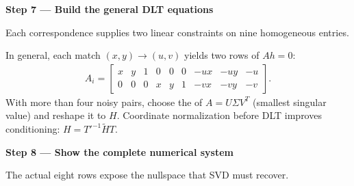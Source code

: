 \documentclass[letterpaper,11pt,english,openany,oneside]{jupyterBook}
\begin{document}
\par\medskip{}
{\color{QuizStepRed}\bfseries Step 7 — Build the general DLT equations}\par\smallskip

\sphinxAtStartPar
{} Each correspondence supplies two linear constraints on nine homogeneous entries.

\sphinxAtStartPar
In general, each match {\color{QuizMathBlue} \((x,y)\to(u,v)\)} yields two rows of {\color{QuizMathBlue} \(Ah=0\)}:
{\color{QuizMathBlue} \begin{equation*}
\begin{split}
A_i=\begin{bmatrix}x&y&1&0&0&0&-ux&-uy&-u\\0&0&0&x&y&1&-vx&-vy&-v\end{bmatrix}.
\end{split}
\end{equation*}}
\sphinxAtStartPar
With more than four noisy pairs, choose the  of {\color{QuizMathBlue} \(A=U\Sigma V^T\)} (smallest singular value) and reshape it to {\color{QuizMathBlue} \(H\)}. Coordinate normalization before DLT improves conditioning: {\color{QuizMathBlue} \(H=T'^{-1}\widetilde HT\)}.

\par

\par\medskip{}
{\color{QuizStepRed}\bfseries Step 8 — Show the complete numerical system}\par\smallskip

\sphinxAtStartPar
{} The actual eight rows expose the nullspace that SVD must recover.
\end{document}
